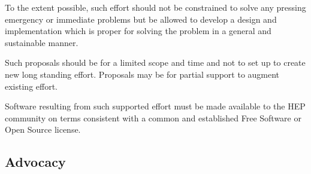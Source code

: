 To the extent possible, such effort should not be constrained to solve
any pressing emergency or immediate problems but be allowed to develop
a design and implementation which is proper for solving the problem in
a general and sustainable manner.

Such proposals should be for a limited scope and time and not to set
up to create new long standing effort.  Proposals may be for partial
support to augment existing effort.

Software resulting from such supported effort must be made available
to the HEP community on terms consistent with a common and established
Free Software or Open Source license.

\subsection{Advocacy}


